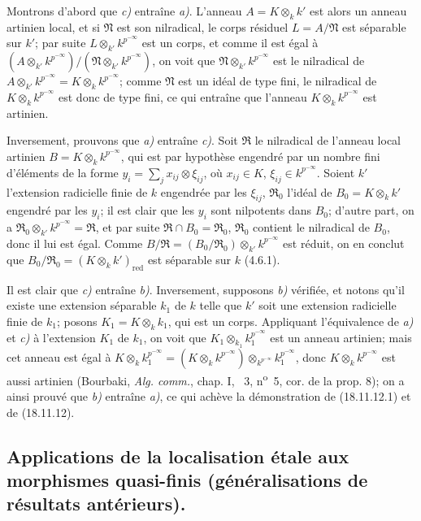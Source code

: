 Montrons d'abord que \emph{c)} entraîne \emph{a)}. L'anneau $A=K\otimes_k k'$ est alors un anneau artinien local, et si $\mathfrak N$ est son nilradical, le corps résiduel $L=A/\mathfrak N$ est séparable sur $k'$; par suite $L\otimes_{k'}k^{p^{-\infty}}$ est un corps, et comme il est égal à $(A\otimes_{k'}k^{p^{-\infty}})/(\mathfrak N\otimes_{k'}k^{p^{-\infty}})$, on voit que $\mathfrak N\otimes_{k'}k^{p^{-\infty}}$ est le nilradical de $A\otimes_{k'}k^{p^{-\infty}}=K\otimes_k k^{p^{-\infty}}$; comme $\mathfrak N$ est un idéal de type fini, le nilradical de $K\otimes_k k^{p^{-\infty}}$ est donc de type fini, ce qui entraîne que l'anneau $K\otimes_k k^{p^{-\infty}}$ est artinien.

Inversement, prouvons que \emph{a)} entraîne \emph{c)}. Soit $\mathfrak R$ le nilradical de l'anneau local artinien $B=K\otimes_k k^{p^{-\infty}}$, qui est par hypothèse engendré par un nombre fini d'éléments de la forme $y_i=\sum_j x_{ij}\otimes\xi_{ij}$, où $x_{ij}\in K$, $\xi_{ij}\in k^{p^{-\infty}}$. Soient $k'$ l'extension radicielle finie de $k$ engendrée par les $\xi_{ij}$, $\mathfrak R_0$ l'idéal de $B_0=K\otimes_k k'$ engendré par les $y_i$; il est clair que les $y_i$ sont nilpotents dans $B_0$; d'autre part, on a $\mathfrak R_0\otimes_{k'}k^{p^{-\infty}}=\mathfrak R$, et par suite $\mathfrak R\cap B_0=\mathfrak R_0$, $\mathfrak R_0$ contient le nilradical de $B_0$, donc il lui est égal. Comme $B/\mathfrak R=(B_0/\mathfrak R_0)\otimes_{k'}k^{p^{-\infty}}$ est réduit, on en conclut que $B_0/\mathfrak R_0=(K\otimes_k k')_{\mathrm{red}}$ est séparable sur $k$ (4.6.1).

Il est clair que \emph{c)} entraîne \emph{b)}. Inversement, supposons \emph{b)} vérifiée, et notons qu'il existe une extension séparable $k_1$ de $k$ telle que $k'$ soit une extension radicielle finie de $k_1$; posons $K_1=K\otimes_k k_1$, qui est un corps. Appliquant l'équivalence de \emph{a)} et \emph{c)} à l'extension $K_1$ de $k_1$, on voit que $K_1\otimes_{k_1}k_1^{p^{-\infty}}$ est un anneau artinien; mais cet anneau est égal
à $K\otimes_k k_1^{p^{-\infty}}=(K\otimes_k k^{p^{-\infty}})\otimes_{k^{p^{-\infty}}}k_1^{p^{-\infty}}$, donc $K\otimes_k k^{p^{-\infty}}$ est aussi artinien (Bourbaki, \emph{Alg. comm.}, chap. I, \textsection~3, n\textsuperscript{o}~5, cor. de la prop. 8); on a ainsi prouvé que \emph{b)} entraîne \emph{a)}, ce qui achève la démonstration de (18.11.12.1) et de (18.11.12).

\subsection{Applications de la localisation étale aux morphismes quasi-finis (généralisations de résultats antérieurs).}

